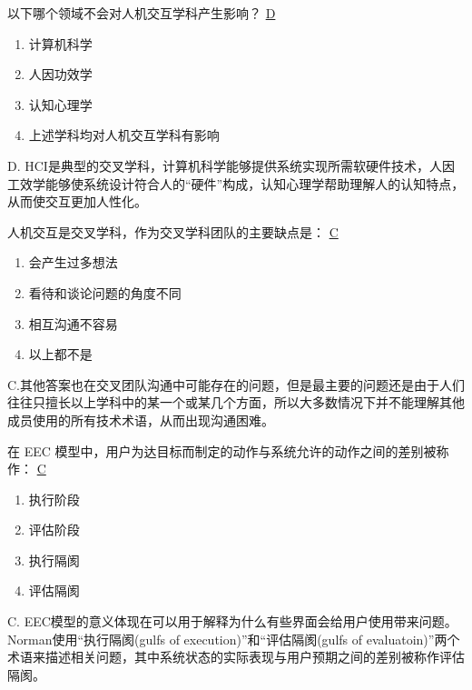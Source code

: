 \begin{problem}
	以下哪个领域不会对人机交互学科产生影响？
	\uline{D}    
    \vspace{-0.8em}
    \begin{multicols}{2}
        \begin{enumerate}[label=\Alph*.]
            \item 计算机科学
            \item 人因功效学
            \item 认知心理学
            \item 上述学科均对人机交互学科有影响
        \end{enumerate}
    \end{multicols}
    \vspace{-1em}
\end{problem}

\begin{solution}
D. HCI是典型的交叉学科，计算机科学能够提供系统实现所需软硬件技术，人因工效学能够使系统设计符合人的“硬件”构成，认知心理学帮助理解人的认知特点，从而使交互更加人性化。
\end{solution}


\begin{problem}
	人机交互是交叉学科，作为交叉学科团队的主要缺点是：
	\uline{C}    
    \vspace{-0.8em}
    \begin{multicols}{2}
        \begin{enumerate}[label=\Alph*.]
            \item 会产生过多想法
            \item 看待和谈论问题的角度不同
            \item 相互沟通不容易
            \item 以上都不是
        \end{enumerate}
    \end{multicols}
    \vspace{-1em}
\end{problem}

\begin{solution}
C.其他答案也在交叉团队沟通中可能存在的问题，但是最主要的问题还是由于人们往往只擅长以上学科中的某一个或某几个方面，所以大多数情况下并不能理解其他成员使用的所有技术术语，从而出现沟通困难。
\end{solution}


\begin{problem}
	在 EEC 模型中，用户为达目标而制定的动作与系统允许的动作之间的差别被称作：
	\uline{C}    
    \vspace{-0.8em}
    \begin{multicols}{4}
        \begin{enumerate}[label=\Alph*.]
            \item 执行阶段
            \item 评估阶段
            \item 执行隔阂
            \item 评估隔阂
        \end{enumerate}
    \end{multicols}
    \vspace{-1em}
\end{problem}

\begin{solution}
C. EEC模型的意义体现在可以用于解释为什么有些界面会给用户使用带来问题。Norman使用“执行隔阂(gulfs of execution)”和“评估隔阂(gulfs of evaluatoin)”两个术语来描述相关问题，其中系统状态的实际表现与用户预期之间的差别被称作评估隔阂。
\end{solution}